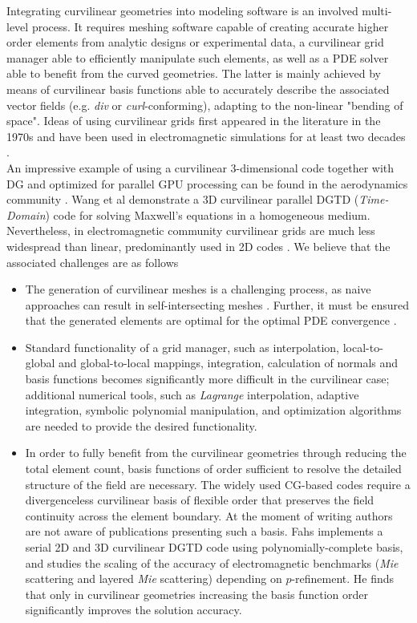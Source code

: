 
\noindent
Integrating curvilinear geometries into modeling software is an involved multi-level process. It requires meshing software capable of creating accurate higher order elements from analytic designs or experimental data, a curvilinear grid manager able to efficiently manipulate such elements, as well as a PDE solver able to benefit from the curved geometries. The latter is mainly achieved by means of curvilinear basis functions able to accurately describe the associated vector fields (e.g. \textit{div} or \textit{curl}-conforming), adapting to the non-linear "bending of space". Ideas of using curvilinear grids first appeared in the literature in the 1970s \citep{ciarlet+1972, lenoir1986} and have been used in electromagnetic simulations for at least two decades \citep{wang+1993}. \\

\noindent
An impressive example of using a curvilinear $3$-dimensional code together with DG and optimized for parallel GPU processing can be found in the aerodynamics community \cite{Warburton2012}.
Wang et al \cite{wang+2011} demonstrate a 3D curvilinear parallel DGTD (\textit{Time-Domain}) code for solving Maxwell's equations in a homogeneous medium.
Nevertheless, in electromagnetic community curvilinear grids are much less widespread than linear, predominantly used in 2D codes \citep{wang+2011a}.
We believe that the associated challenges are as follows
\begin{itemize}
\item The generation of curvilinear meshes is a challenging process, as naive approaches can result in self-intersecting meshes \citep{toulorge+2013, johnen+2012}. Further, it must be ensured that the generated elements are optimal for the optimal PDE convergence \cite{lenoir1986}.
\item Standard functionality of a grid manager, such as interpolation, local-to-global and global-to-local mappings, integration, calculation of normals and basis functions becomes significantly more difficult in the curvilinear case; additional numerical tools, such as \textit{Lagrange} interpolation, adaptive integration, symbolic polynomial manipulation, and optimization algorithms are needed to provide the desired functionality. 
\item In order to fully benefit from the curvilinear geometries through reducing the total element count, basis functions of order sufficient to resolve the detailed structure of the field are necessary. The widely used CG-based codes require a divergenceless curvilinear basis of flexible order that preserves the field continuity across the element boundary. At the moment of writing authors are not aware of publications presenting such a basis. Fahs\cite{fahs2011} implements a serial 2D and 3D curvilinear DGTD code using polynomially-complete basis, and studies the scaling of the accuracy of electromagnetic benchmarks (\textit{Mie} scattering and layered \textit{Mie} scattering) depending on $p$-refinement. He finds that only in curvilinear geometries increasing the basis function order significantly improves the solution accuracy.
\end{itemize}

